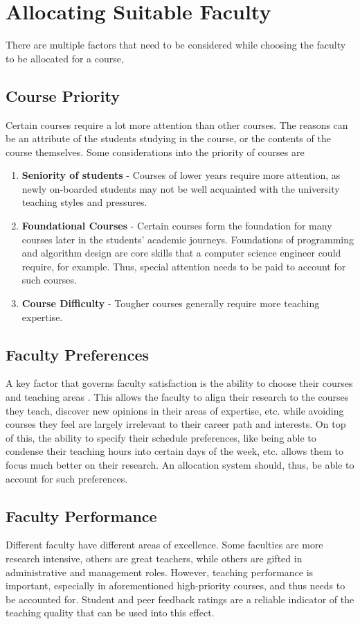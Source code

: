 \section{Allocating Suitable Faculty}
\label{section:allocation_criteria}

There are multiple factors that need to be considered while choosing the faculty to be allocated for a course,
\subsection{Course Priority}
Certain courses require a lot more attention than other courses. The reasons can be an attribute of the students studying in the course, or the contents of the course themselves. Some considerations into the priority of courses are
\begin{enumerate}
    \item \textbf{Seniority of students} - Courses of lower years require more attention, as newly on-boarded students may not be well acquainted with the university teaching styles and pressures.
    \item \textbf{Foundational Courses} - Certain courses form the foundation for many courses later in the students' academic journeys. Foundations of programming and algorithm design are core skills that a computer science engineer could require, for example. Thus, special attention needs to be paid to account for such courses.
    \item \textbf{Course Difficulty} - Tougher courses generally require more teaching expertise.
\end{enumerate}

\subsection{Faculty Preferences}
A key factor that governs faculty satisfaction is the ability to choose their courses and teaching areas \cite{schniederjans1987goal, badri1998multi}. This allows the faculty to align their research to the courses they teach, discover new opinions in their areas of expertise, etc. while avoiding courses they feel are largely irrelevant to their career path and interests. On top of this, the ability to specify their schedule preferences, like being able to condense their teaching hours into certain days of the week, etc. allows them to focus much better on their research. An allocation system should, thus, be able to account for such preferences.

\subsection{Faculty Performance}
Different faculty have different areas of excellence. Some faculties are more research intensive, others are great teachers, while others are gifted in administrative and management roles. However, teaching performance is important, especially in aforementioned high-priority courses, and thus needs to be accounted for. Student and peer feedback ratings are a reliable indicator of the teaching quality that can be used into this effect.

